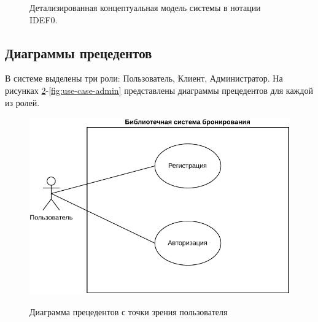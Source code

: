 \documentclass[a4paper, 12pt]{article}
\begin{document}
\begin{large}
\begin{landscape}
	\begin{figure}[h!]
		\caption{Детализированная концептуальная модель системы в нотации IDEF0.}
		\label{fig:idef0-2}
	\end{figure}
\end{landscape}


\subsection{Диаграммы прецедентов}
В системе выделены три роли: Пользователь, Клиент, Администратор. 
На рисунках \ref{fig:use-case-user}-\ref{fig:use-case-admin} представлены диаграммы прецедентов для каждой из ролей. 

\begin{figure}[h]
	\begin{center}
		{\includegraphics[scale = 1.1]{UseCaseUser}}
		\caption{Диаграмма прецедентов с точки зрения пользователя}
		\label{fig:use-case-user}
	\end{center}
\end{figure}


\end{large}
\end{document}
